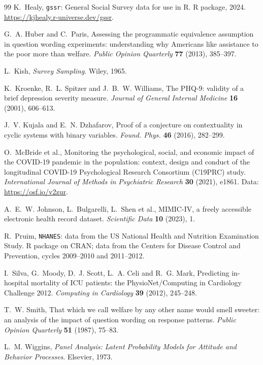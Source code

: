 \documentclass[11pt]{article}
\theoremstyle{definition}
\theoremstyle{remark}
\begin{document}
\begin{thebibliography}{99}
K.~Healy, \texttt{gssr}: General Social Survey data for use in R. R package, 2024. \url{https://kjhealy.r-universe.dev/gssr}.

G.~A. Huber and C.~Paris, Assessing the programmatic equivalence assumption in question wording experiments: understanding why Americans
like assistance to the poor more than welfare. \emph{Public Opinion Quarterly} \textbf{77} (2013), 385--397.

L.~Kish, \emph{Survey Sampling}. Wiley, 1965.

K.~Kroenke, R.~L. Spitzer and J.~B.~W. Williams, The PHQ-9: validity of a brief depression severity measure. \emph{Journal of General
Internal Medicine} \textbf{16} (2001), 606--613.

J.~V. Kujala and E.~N. Dzhafarov, Proof of a conjecture on contextuality in cyclic systems with binary variables. \emph{Found. Phys.}
\textbf{46} (2016), 282--299.

O.~McBride et al.,
Monitoring the psychological, social, and economic impact of the COVID-19 pandemic in the population: context, design and conduct of the
longitudinal COVID-19 Psychological Research Consortium (C19PRC) study. \emph{International Journal of Methods in Psychiatric Research}
\textbf{30} (2021), e1861. Data: \url{https://osf.io/v2zur}.

A.~E.~W. Johnson, L.~Bulgarelli, L.~Shen et al., MIMIC-IV, a freely accessible electronic health record dataset. \emph{Scientific Data}
\textbf{10} (2023), 1.

R.~Pruim, \texttt{NHANES}: data from the US National Health and Nutrition Examination Study. R package on CRAN; data from the Centers
for Disease Control and Prevention, cycles 2009--2010 and 2011--2012.

I.~Silva, G.~Moody, D.~J. Scott, L.~A. Celi and R.~G. Mark, Predicting in-hospital mortality of ICU patients: the PhysioNet/Computing in
Cardiology Challenge 2012. \emph{Computing in Cardiology} \textbf{39} (2012), 245--248.

T.~W. Smith, That which we call welfare by any other name would smell sweeter: an analysis of the impact of question wording on response
patterns. \emph{Public Opinion Quarterly} \textbf{51} (1987), 75--83.

L.~M. Wiggins, \emph{Panel Analysis: Latent Probability Models for Attitude and Behavior Processes}. Elsevier, 1973.


\end{thebibliography}
\end{document}
